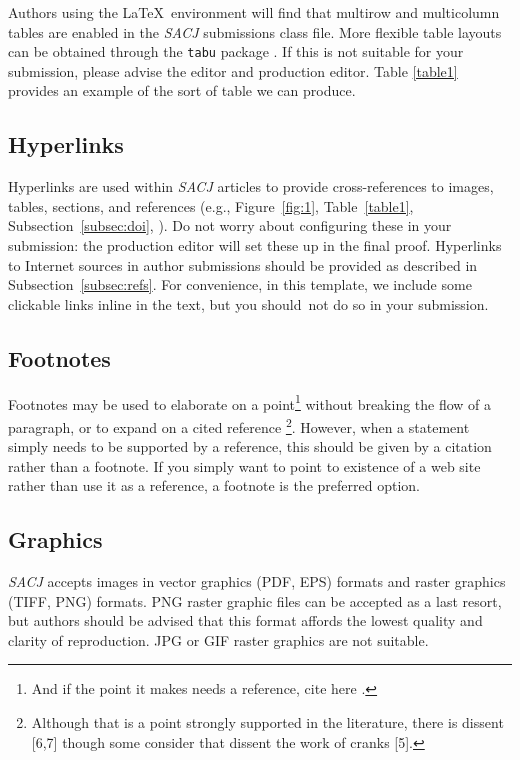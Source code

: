 \documentclass[submission]{sacjsub}
\begin{document}
Authors using the \LaTeX~environment will find that multirow and multicolumn tables are enabled in the {\em SACJ} submissions class file. More flexible table layouts can be obtained through the {\verb"tabu"} package \cite{chervetnd}. If this is not suitable for your submission, please advise the editor and production editor. Table \ref{table1} provides an example of the sort of table we can produce.

\subsection{Hyperlinks}
Hyperlinks are used within {\em SACJ} articles to provide cross-references to images, tables, sections, and references (e.g., Figure~\ref{fig:1}, Table~\ref{table1}, Subsection~\ref{subsec:doi}, \cite{kopka1995guide}). Do not worry about configuring these in your submission: the production editor will set these up in the final proof. Hyperlinks to Internet sources in author submissions should be provided as described in Subsection~\ref{subsec:refs}. For convenience, in this template, we include some clickable links inline in the text, but you should~not do so in your submission.  

\subsection{Footnotes}
Footnotes may be used to elaborate on a point\footnote{And if the point it makes needs a reference, cite here \cite{kopka1995guide}.} without breaking the flow of a paragraph, or to expand on a cited reference \cite{apa2013}\footnote{Although that is a point strongly supported in the literature, there is dissent [6,7] though some consider that dissent the work of cranks [5].}. However, when a statement simply needs to be supported by a reference, this should be given by a citation rather than a footnote. If you simply want to point to
existence of a web site rather than use it as a reference, a footnote is the preferred option.

\subsection{Graphics}
{\em SACJ} accepts images in vector graphics (PDF, EPS) formats and raster graphics (TIFF, PNG) formats. PNG raster graphic files can be accepted as a last resort, but authors should be advised that this format affords the lowest quality and clarity of reproduction. JPG or GIF raster graphics are not suitable.
\end{document}
